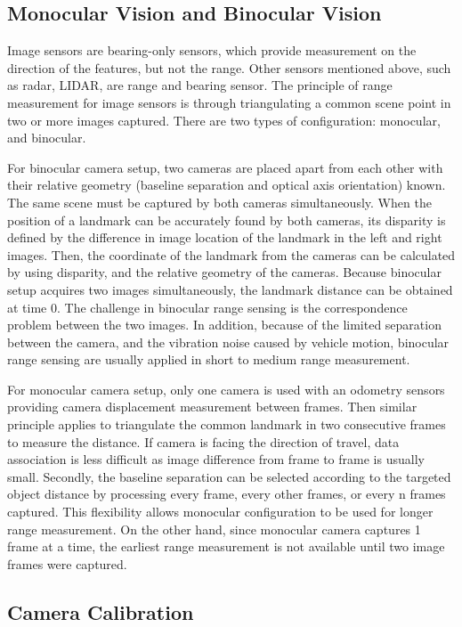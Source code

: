 \subsection{Monocular Vision and Binocular Vision}
Image sensors are bearing-only sensors, which provide measurement on
the direction of the features, but not the range. Other sensors
mentioned above, such as radar, LIDAR, are range and bearing sensor.
The principle of range measurement for image sensors is through
triangulating a common scene point in two or more images captured.
There are two types of configuration: monocular, and binocular.

For binocular camera setup, two cameras are placed apart from each
other with their relative geometry (baseline separation and optical
axis orientation) known. The same scene must be captured by both
cameras simultaneously. When the position of a landmark can be
accurately found by both cameras, its disparity is defined by the
difference in image location of the landmark in the left and right
images. Then, the coordinate of the landmark from the cameras can be
calculated by using disparity, and the relative geometry of the
cameras. Because binocular setup acquires two images simultaneously,
the landmark distance can be obtained at time $0$. The challenge in
binocular range sensing is the correspondence problem between the two
images. In addition, because of the limited separation between the
camera, and the vibration noise caused by vehicle motion, binocular
range sensing are usually applied in short to medium range
measurement.

For monocular camera setup, only one camera is used with an odometry
sensors providing camera displacement measurement between frames. Then
similar principle applies to triangulate the common landmark in two
consecutive frames to measure the distance. If camera is facing the
direction of travel, data association is less difficult as image
difference from frame to frame is usually small. Secondly, the
baseline separation can be selected according to the targeted object
distance by processing every frame, every other frames, or every n
frames captured. This flexibility allows monocular configuration to be
used for longer range measurement. On the other hand, since monocular
camera captures 1 frame at a time, the earliest range measurement is
not available until two image frames were captured.

\subsection{Camera Calibration}

